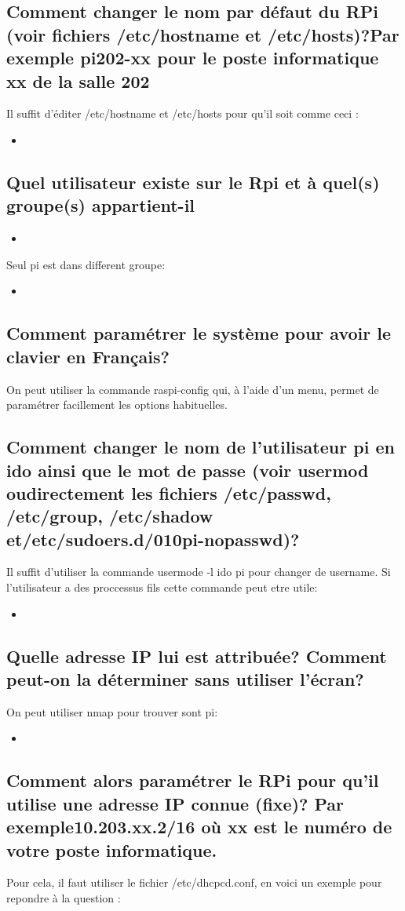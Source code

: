 \documentclass[a4paper,10pt]{article}
\newcommand{\insertcode}[2]{\begin{itemize}\item[]\end{itemize}}
\begin{document}
\subsection{Comment changer le nom par défaut du RPi (voir fichiers /etc/hostname et /etc/hosts)?Par exemple pi202-xx pour le poste informatique xx de la salle 202}
Il suffit d'éditer /etc/hostname et /etc/hosts pour qu'il soit comme ceci :
\insertcode{commande/4.txt}{Changement d'hostname}
\newpage
\subsection{Quel utilisateur existe sur le Rpi et à quel(s) groupe(s) appartient-il}
\insertcode{commande/5.txt}{liste des Users sur la machine}
Seul pi est dans different groupe:
\insertcode{commande/6.txt}{groupe de pi }
\newpage
\subsection{Comment paramétrer le système pour avoir le clavier en Français?}
On peut utiliser la commande raspi-config qui, à l'aide d'un menu, permet de paramétrer facillement les options habituelles.

\subsection{Comment changer le nom de l’utilisateur pi en ido ainsi que le mot de passe (voir usermod oudirectement   les   fichiers   /etc/passwd,   /etc/group,   /etc/shadow   et/etc/sudoers.d/010pi-nopasswd)?}
Il suffit d'utiliser la commande usermode -l ido pi pour changer de username.
Si l'utilisateur a des proccessus fils cette commande peut etre utile:

\insertcode{commande/7.txt}{pkill tips}

\subsection{Quelle adresse IP lui est attribuée? Comment peut-on la déterminer sans utiliser l’écran?}
On peut utiliser nmap pour trouver sont pi:
\insertcode{commande/8.txt}{nmap search}
\newpage
\subsection{Comment alors paramétrer le RPi pour qu’il utilise une adresse IP connue (fixe)? Par exemple10.203.xx.2/16 où xx est le numéro de votre poste informatique.}
Pour cela, il faut utiliser le fichier /etc/dhcpcd.conf, en voici un exemple pour repondre à la question :
\end{document}
